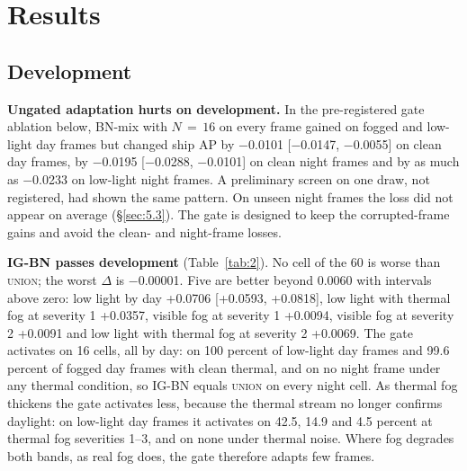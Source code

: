 \documentclass[10pt]{article}
\begin{document}
\section{Results}\label{sec:5}
\subsection{Development}\label{sec:5.1}
\textbf{Ungated adaptation hurts on development.} In the pre-registered gate ablation below, BN-mix with $N\,{=}\,16$ on every frame gained on fogged and low-light day frames but changed ship AP by $-$0.0101 [$-$0.0147, $-$0.0055] on clean day frames, by $-$0.0195 [$-$0.0288, $-$0.0101] on clean night frames and by as much as $-$0.0233 on low-light night frames. A preliminary screen on one draw, not registered, had shown the same pattern. On unseen night frames the loss did not appear on average (\S\ref{sec:5.3}). The gate is designed to keep the corrupted-frame gains and avoid the clean- and night-frame losses.

\textbf{IG-BN passes development} (Table~\ref{tab:2}). No cell of the 60 is worse than \textsc{union}; the worst $\Delta$ is $-$0.00001. Five are better beyond 0.0060 with intervals above zero: low light by day +0.0706 [+0.0593, +0.0818], low light with thermal fog at severity 1 +0.0357, visible fog at severity 1 +0.0094, visible fog at severity 2 +0.0091 and low light with thermal fog at severity 2 +0.0069. The gate activates on 16 cells, all by day: on 100 percent of low-light day frames and 99.6 percent of fogged day frames with clean thermal, and on no night frame under any thermal condition, so IG-BN equals \textsc{union} on every night cell. As thermal fog thickens the gate activates less, because the thermal stream no longer confirms daylight: on low-light day frames it activates on 42.5, 14.9 and 4.5 percent at thermal fog severities 1--3, and on none under thermal noise. Where fog degrades both bands, as real fog does, the gate therefore adapts few frames.
\end{document}
